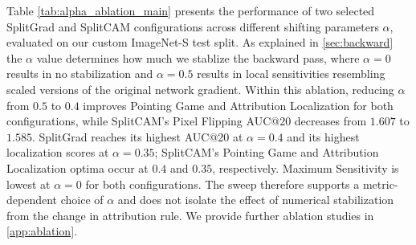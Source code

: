 Table \ref{tab:alpha_ablation_main} presents the performance of two selected SplitGrad and SplitCAM configurations across different shifting parameters $\alpha$, evaluated on our custom ImageNet-S test split.
As explained in \cref{sec:backward} the $\alpha$ value determines how much we stablize the backward pass, where $\alpha=0$ results in no stabilization and $\alpha = 0.5$ results in local sensitivities resembling scaled versions of the original network gradient.
Within this ablation, reducing $\alpha$ from $0.5$ to $0.4$ improves Pointing Game and Attribution Localization for both configurations, while SplitCAM's Pixel Flipping AUC@20 decreases from $1.607$ to $1.585$. SplitGrad reaches its highest AUC@20 at $\alpha = 0.4$ and its highest localization scores at $\alpha = 0.35$; SplitCAM's Pointing Game and Attribution Localization optima occur at $0.4$ and $0.35$, respectively. Maximum Sensitivity is lowest at $\alpha = 0$ for both configurations. The sweep therefore supports a metric-dependent choice of $\alpha$ and does not isolate the effect of numerical stabilization from the change in attribution rule.
We provide further ablation studies in \cref{app:ablation}.
